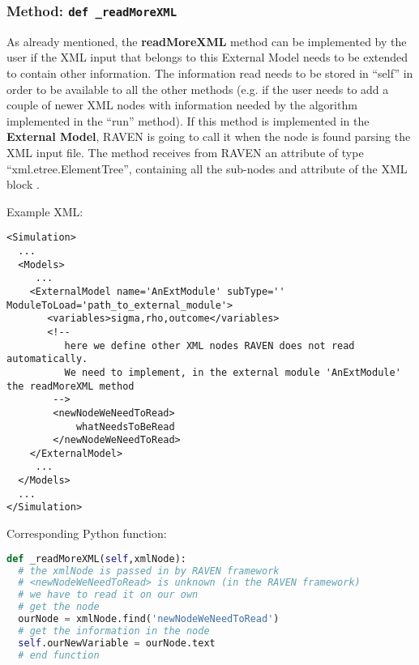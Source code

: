 \subsubsection{Method: \texttt{def \_readMoreXML}}
\label{subsubsec:externalReadMoreXML}
As already mentioned, the \textbf{readMoreXML} method can be implemented by the
user if the XML input that belongs to this External Model needs to be extended
to contain other information.
%
The information read needs to be stored in ``self'' in order to be available to
all the other methods (e.g. if the user needs to add a couple of newer XML nodes
with information needed by the algorithm implemented in the ``run'' method).
%
If this method is implemented in the \textbf{External Model}, RAVEN is going to
call it when the node  is found parsing the XML input
file.
%
The method receives from RAVEN an attribute of type ``xml.etree.ElementTree'',
containing all the sub-nodes and attribute of the XML block .
%

Example XML:
\begin{lstlisting}[style=XML,morekeywords={subType,ModuleToLoad}]
<Simulation>
  ...
  <Models>
     ...
    <ExternalModel name='AnExtModule' subType='' ModuleToLoad='path_to_external_module'>
       <variables>sigma,rho,outcome</variables>
       <!--
          here we define other XML nodes RAVEN does not read automatically.
          We need to implement, in the external module 'AnExtModule' the readMoreXML method
        -->
        <newNodeWeNeedToRead>
            whatNeedsToBeRead
        </newNodeWeNeedToRead>
    </ExternalModel>
     ...
  </Models>
  ...
</Simulation>
\end{lstlisting}

Corresponding Python function:
\begin{lstlisting}[language=python]
def _readMoreXML(self,xmlNode):
  # the xmlNode is passed in by RAVEN framework
  # <newNodeWeNeedToRead> is unknown (in the RAVEN framework)
  # we have to read it on our own
  # get the node
  ourNode = xmlNode.find('newNodeWeNeedToRead')
  # get the information in the node
  self.ourNewVariable = ourNode.text
  # end function
\end{lstlisting}



